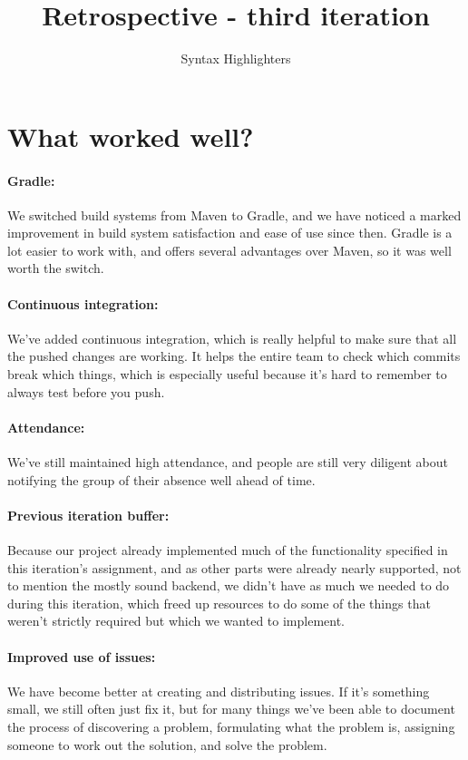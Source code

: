 \documentclass{article}
\title{Retrospective - third iteration}
\author{Syntax Highlighters}
\begin{document}
\maketitle

\section*{What worked well?}

\paragraph{Gradle:} We switched build systems from Maven to Gradle, and we have noticed a marked improvement in build system satisfaction and ease of use since then. Gradle is a lot easier to work with, and offers several advantages over Maven, so it was well worth the switch.

\paragraph{Continuous integration:} We've added continuous integration, which is really helpful to make sure that all the pushed changes are working. It helps the entire team to check which commits break which things, which is especially useful because it's hard to remember to always test before you push.

\paragraph{Attendance:} We've still maintained high attendance, and people are still very diligent about notifying the group of their absence well ahead of time.

\paragraph{Previous iteration buffer:} Because our project already implemented much of the functionality specified in this iteration's assignment, and as other parts were already nearly supported, not to mention the mostly sound backend, we didn't have as much we needed to do during this iteration, which freed up resources to do some of the things that weren't strictly required but which we wanted to implement.

\paragraph{Improved use of issues:} We have become better at creating and distributing issues. If it's something small, we still often just fix it, but for many things we've been able to document the process of discovering a problem, formulating what the problem is, assigning someone to work out the solution, and solve the problem.
\end{document}
